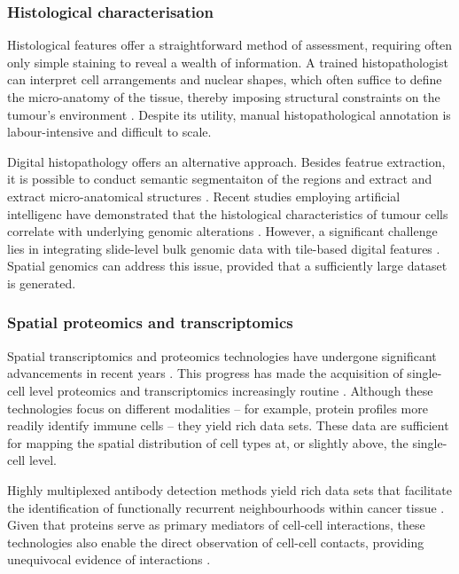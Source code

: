 \subsubsection*{Histological characterisation}

Histological features offer a straightforward method of assessment, requiring often only simple staining to reveal a wealth of information. A trained histopathologist can interpret cell arrangements and nuclear shapes, which often suffice to define the micro-anatomy of the tissue, thereby imposing structural constraints on the tumour's environment . Despite its utility, manual histopathological annotation is labour-intensive and difficult to scale.

Digital histopathology offers an alternative approach. Besides featrue extraction, it is possible to conduct semantic segmentaiton of the regions and extract and extract micro-anatomical structures \parencite{Kiemen2020-dc}. Recent studies employing artificial intelligenc have demonstrated that the histological characteristics of tumour cells correlate with underlying genomic alterations \parencite{Fu2020-cp, Kather2020-bt}. However, a significant challenge lies in integrating slide-level bulk genomic data with tile-based digital features \parencite{Shmatko2022-to}. Spatial genomics can address this issue, provided that a sufficiently large dataset is generated.

\subsubsection*{Spatial proteomics and transcriptomics}

Spatial transcriptomics and proteomics technologies have undergone significant advancements in recent years \parencite{Lewis2021-ic, Mund2022-kf}. This progress has made the acquisition of single-cell level proteomics and transcriptomics increasingly routine . Although these technologies focus on different modalities -- for example, protein profiles more readily identify immune cells -- they yield rich data sets. These data are sufficient for mapping the spatial distribution of cell types at, or slightly above, the single-cell level.

Highly multiplexed antibody detection methods yield rich data sets that facilitate the identification of functionally recurrent neighbourhoods within cancer tissue \parencite{Danenberg2022-zb, Jackson2020-em, Nirmal2022-sq, Schurch2020-lp, Wang2023-bo}. Given that proteins serve as primary mediators of cell-cell interactions, these technologies also enable the direct observation of cell-cell contacts, providing unequivocal evidence of interactions \parencite{Nirmal2022-sq, Wang2023-bo}.

